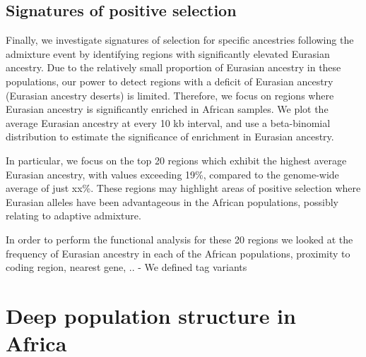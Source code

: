

\subsection{Signatures of positive selection} 

Finally, we investigate signatures of selection for specific ancestries following the admixture event by identifying regions with significantly elevated Eurasian ancestry. Due to the relatively small proportion of Eurasian ancestry in these populations, our power to detect regions with a deficit of Eurasian ancestry (Eurasian ancestry deserts) is limited. Therefore, we focus on regions where Eurasian ancestry is significantly enriched in African samples. We plot the average Eurasian ancestry at every 10 kb interval, and use a beta-binomial distribution to estimate the significance of enrichment in Eurasian ancestry. 

In particular, we focus on the top 20 regions which exhibit the highest average Eurasian ancestry, with values exceeding 19\%, compared to the genome-wide average of just xx\%. These regions may highlight areas of positive selection where Eurasian alleles have been advantageous in the African populations, possibly relating to adaptive admixture.

In order to perform the functional analysis for these 20 regions we looked at the frequency of Eurasian ancestry in each of the African populations, proximity to coding region, nearest gene, ..
- We defined tag variants




\section{Deep population structure in Africa}
\label{sec:ch3-gb-deep}

